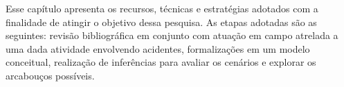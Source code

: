 Esse capítulo apresenta os recursos, técnicas e estratégias adotados com a finalidade de atingir o objetivo dessa pesquisa. As etapas adotadas são as seguintes: revisão bibliográfica em conjunto com atuação em campo atrelada a uma dada atividade envolvendo acidentes, formalizações em um modelo conceitual, realização de inferências para avaliar os cenários e explorar os arcabouços possíveis.
